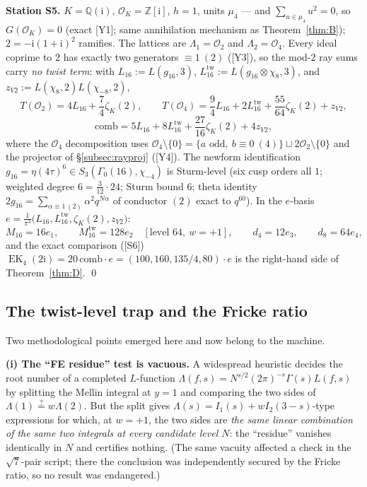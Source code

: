 \documentclass[11pt]{article}
\newcommand{\Qq}{\mathbb{Q}}
\newcommand{\Zz}{\mathbb{Z}}
\newcommand{\ii}{\mathrm{i}}
\newcommand{\OO}{\mathcal{O}}
\DeclareMathOperator{\EK}{EK}
\theoremstyle{definition}
\theoremstyle{remark}
\begin{document}
\textbf{Station S5.} $K=\Qq(\ii)$, $\OO_K=\Zz[\ii]$, $h=1$, units
$\mu_4$ --- and $\sum_{u\in\mu_4}u^2=0$, so $G(\OO_K)=0$ (exact [Y1];
same annihilation mechanism as Theorem~\ref{thm:B}); $2=-\ii(1+\ii)^2$
ramifies. The lattices are $\Lambda_1=\OO_2$ and $\Lambda_2=\OO_4$.
Every ideal coprime to $2$ has exactly two generators
$\equiv1\ (2)$ ([Y3]), so the mod-$2$ ray sums carry \emph{no twist
term}: with $L_{16}:=L(g_{16},3)$,
$L_{16}^{\mathrm{tw}}:=L(g_{16}\otimes\chi_8,3)$, and
$z_{V2}:=L(\chi_8,2)L(\chi_{-8},2)$,
\[
  T(\OO_2)=4L_{16}+\frac74\zeta_K(2),\qquad
  T(\OO_4)=\frac94L_{16}+2L_{16}^{\mathrm{tw}}+\frac{55}{64}\zeta_K(2)
   +z_{V2},
\]
\[
  \mathrm{comb}=5L_{16}+8L_{16}^{\mathrm{tw}}+\frac{27}{16}\zeta_K(2)
   +4z_{V2},
\]
where the $\OO_4$ decomposition uses
$\OO_4\setminus\{0\}=\{a\text{ odd},\ b\equiv0\ (4)\}\sqcup
2\OO_2\setminus\{0\}$ and the projector of
\S\ref{subsec:rayproj} ([Y4]). The newform identification
$g_{16}=\eta(4\tau)^6\in S_3(\Gamma_0(16),\chi_{-4})$ is Sturm-level
(six cusp orders all $1$; weighted degree $6=\frac{3}{12}\cdot24$;
Sturm bound $6$; theta identity
$2g_{16}=\sum_{\alpha\equiv1\,(2)}\alpha^2q^{N\alpha}$ of conductor
$(2)$ exact to $q^{60}$). In the $e$-basis
$e=\frac1{\pi^3}\bigl(L_{16},L_{16}^{\mathrm{tw}},\zeta_K(2),z_{V2}\bigr)$:
\[
  M_{16}=16e_1,\qquad M_{16}^{\mathrm{tw}}=128e_2\quad
  [\text{level }64,\ w=+1],\qquad d_4=12e_3,\qquad d_8=64e_4,
\]
and the exact comparison ([S6])
$\EK_4(2\ii)=20\,\mathrm{comb}\cdot e=(100,160,135/4,80)\cdot e$
is the right-hand side of Theorem~\ref{thm:D}. \qed

\subsection{The twist-level trap and the Fricke ratio}\label{subsec:twisttrap}

Two methodological points emerged here and now belong to the machine.

\textbf{(i) The ``FE residue'' test is vacuous.} A widespread
heuristic decides the root number of a completed $L$-function
$\Lambda(f,s)=N^{s/2}(2\pi)^{-s}\Gamma(s)L(f,s)$ by splitting the
Mellin integral at $y=1$ and comparing the two sides of
$\Lambda(1)\stackrel?=w\Lambda(2)$. But the split gives
$\Lambda(s)=I_1(s)+wI_2(3-s)$-type expressions for which, at
$w=+1$, the two sides are \emph{the same linear combination of the
same two integrals at every candidate level $N$}: the ``residue''
vanishes identically in $N$ and certifies nothing. (The same vacuity
affected a check in the $\sqrt7$-pair script; there the conclusion
was independently secured by the Fricke ratio, so no result was
endangered.)
\end{document}
